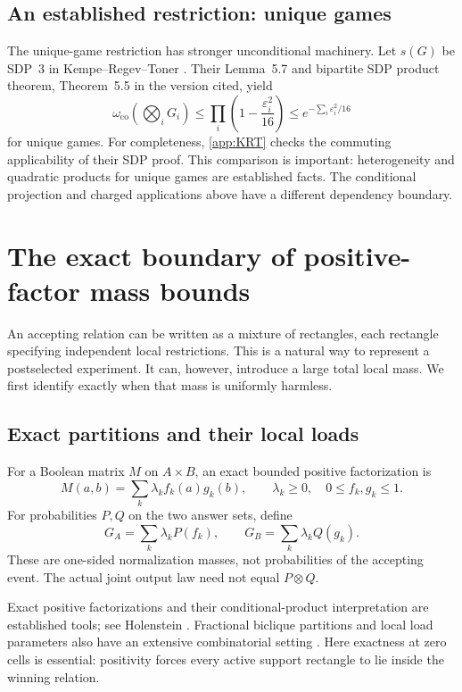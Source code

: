 \documentclass[11pt,reqno]{amsart}
\numberwithin{equation}{section}
\theoremstyle{definition}
\theoremstyle{remark}
\newcommand{\eps}{\varepsilon}
\newcommand{\co}{\mathrm{co}}
\begin{document}
\subsection{An established restriction: unique games}
The unique-game restriction has stronger unconditional machinery. Let \(s(G)\) be SDP~3 in Kempe--Regev--Toner \cite{KRT}. Their Lemma~5.7 and bipartite SDP product theorem, Theorem~5.5 in the version cited, yield
\begin{equation}\label{eq:KRT}
 \omega_{\co}\left(\bigotimes_iG_i\right)
 \le\prod_i\left(1-\frac{\eps_i^2}{16}\right)
 \le e^{-\sum_i\eps_i^2/16}
\end{equation}
for unique games. For completeness, \cref{app:KRT} checks the commuting applicability of their SDP proof. This comparison is important: heterogeneity and quadratic products for unique games are established facts. The conditional projection and charged applications above have a different dependency boundary.



\section{The exact boundary of positive-factor mass bounds}\label{sec:factors}
An accepting relation can be written as a mixture of rectangles, each rectangle specifying independent local restrictions. This is a natural way to represent a postselected experiment. It can, however, introduce a large total local mass. We first identify exactly when that mass is uniformly harmless.

\subsection{Exact partitions and their local loads}
For a Boolean matrix \(M\) on \(A\times B\), an exact bounded positive factorization is
\[
 M(a,b)=\sum_k\lambda_k f_k(a)g_k(b),\qquad
 \lambda_k\ge0,\quad 0\le f_k,g_k\le1.
\]
For probabilities \(P,Q\) on the two answer sets, define
\[
 G_A=\sum_k\lambda_k P(f_k),\qquad
 G_B=\sum_k\lambda_k Q(g_k).
\]
These are one-sided normalization masses, not probabilities of the accepting event. The actual joint output law need not equal \(P\otimes Q\).

Exact positive factorizations and their conditional-product interpretation are established tools; see Holenstein \cite[Definition~8.1 and Lemma~8.3]{Holenstein}. Fractional biclique partitions and local load parameters also have an extensive combinatorial setting \cite{Watts,Pinto}. Here exactness at zero cells is essential: positivity forces every active support rectangle to lie inside the winning relation.
\end{document}
